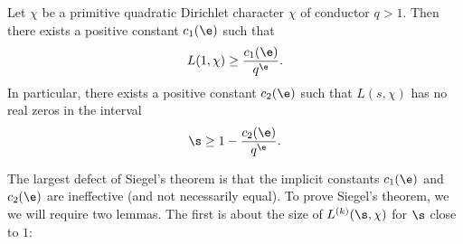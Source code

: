     \begin{theorem*}
      Let \(\chi\) be a primitive quadratic Dirichlet character \(\chi\) of conductor \(q > 1\). Then there exists a positive constant \(c_{1}(\e)\) such that
      \[
        L(1,\chi) \ge \frac{c_{1}(\e)}{q^{\e}}.
      \]
      In particular, there exists a positive constant \(c_{2}(\e)\) such that \(L(s,\chi)\) has no real zeros in the interval
      \[
        \s \ge 1-\frac{c_{2}(\e)}{q^{\e}}.
      \]
    \end{theorem*}

    The largest defect of Siegel's theorem is that the implicit constants \(c_{1}(\e)\) and \(c_{2}(\e)\) are ineffective (and not necessarily equal). To prove Siegel's theorem, we we will require two lemmas. The first is about the size of \(L^{(k)}(\s,\chi)\) for \(\s\) close to \(1\):


